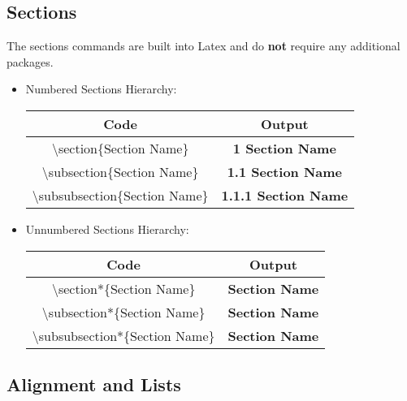 \documentclass[11pt,onecolumn]{article}
\theoremstyle{definition}
\begin{document}
\subsection{Sections}
The sections commands are built into Latex and do \textbf{not} require any additional packages. 
\begin{itemize}
    \item Numbered Sections Hierarchy:
    
    \renewcommand{\arraystretch}{1.5}
    \begin{center}
    \begin{tabular}{|c|c|}
    \hline
    \textbf{Code} & \textbf{Output} \\
    \hline
    \textbackslash section\{Section Name\} & \huge{\textbf{1 Section Name}} \\
    \hline
    \textbackslash subsection\{Section Name\} & \Large{\textbf{1.1 Section Name}} \\
    \hline
    \textbackslash subsubsection\{Section Name\} & \textbf{1.1.1 Section Name} \\
    \hline
    \end{tabular}
    \end{center}
    
\end{itemize}
\begin{itemize}
    \item Unnumbered Sections Hierarchy:
    
    \renewcommand{\arraystretch}{1.5}
    \begin{center}
    \begin{tabular}{|c|c|}
    \hline
    \textbf{Code} & \textbf{Output} \\
    \hline
    \textbackslash section*\{Section Name\} & \huge{\textbf{Section Name}} \\
    \hline
    \textbackslash subsection*\{Section Name\} & \Large{\textbf{Section Name}} \\
    \hline
    \textbackslash subsubsection*\{Section Name\} & \textbf{Section Name} \\
    \hline
    \end{tabular}
    \end{center}
    
\end{itemize}

\pagebreak
\subsection{Alignment and Lists}
\end{document}
